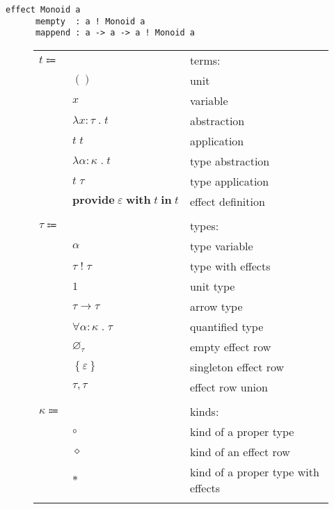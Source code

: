 \documentclass[12pt]{article}
\newcommand\anno[2]{#1 : #2}
\newcommand\term{t}
\newcommand\eunit{()}
\newcommand\evar{x}
\newcommand\eabs[2]{\lambda #1 \; . \; #2}
\newcommand\eapp[2]{#1 \; #2}
\newcommand\etabs[2]{\lambda #1 \; . \; #2}
\newcommand\etapp[2]{#1 \; #2}
\newcommand\eprovide[3]{\textbf{provide} \; #1 \; \textbf{with} \; #2 \; \textbf{in} \; #3}
\newcommand\type{\tau}
\newcommand\tvar{\alpha}
\newcommand\twitht[2]{#1 \; ! \; #2}
\newcommand\tunit{1}
\newcommand\tarrow[2]{#1 \rightarrow #2}
\newcommand\tforall[2]{\forall #1 \; . \; #2}
\newcommand\tempty{\varnothing_{\type}}
\newcommand\tsingleton[1]{\left\{ #1 \right\}}
\newcommand\tunion[2]{#1, #2}
\newcommand\kind{\kappa}
\newcommand\kproper{\circ}
\newcommand\krow{\diamond}
\newcommand\ktwitht{\ast}
\newcommand\effect{\varepsilon}
\begin{document}
  \begin{lstlisting}[gobble=4]
    effect Monoid a
      mempty  : a ! Monoid a
      mappend : a -> a -> a ! Monoid a
  \end{lstlisting}

  \begin{figure}
    \begin{mdframed}[backgroundcolor=none]
      \begin{center}
        \begin{tabular}{l l l}
          $\term \Coloneqq $ & & terms: \\
          & $\eunit$ & unit \\
          & $\evar$ & variable \\
          & $\eabs{\anno{\evar}{\type}}{\term}$ & abstraction \\
          & $\eapp{\term}{\term}$ & application \\
          & $\etabs{\anno{\tvar}{\kind}}{\term}$ & type abstraction \\
          & $\etapp{\term}{\type}$ & type application \\
          & $\eprovide{\effect}{\term}{\term}$ & effect definition \\
          \\
          $\type \Coloneqq$ & & types: \\
          & $\tvar$ & type variable \\
          & $\twitht{\type}{\type}$ & type with effects \\
          & $\tunit$ & unit type \\
          & $\tarrow{\type}{\type}$ & arrow type \\
          & $\tforall{\anno{\tvar}{\kind}}{\type}$ & quantified type \\
          & $\tempty$ & empty effect row \\
          & $\tsingleton{\effect}$ & singleton effect row \\
          & $\tunion{\type}{\type}$ & effect row union \\
          \\
          $\kind \Coloneqq$ & & kinds: \\
          & $\kproper$ & kind of a proper type \\
          & $\krow$ & kind of an effect row \\
          & $\ktwitht$ & kind of a proper type with effects \\
          \\

\end{tabular}
\end{center}
\end{mdframed}
\end{figure}
\end{document}
